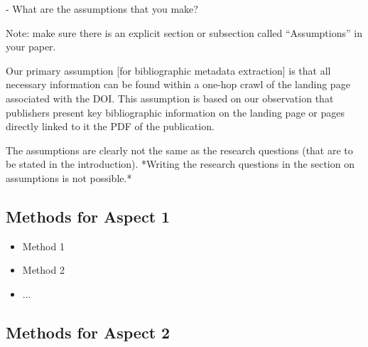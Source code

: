 \documentclass[sigconf, review, nonacm]{acmart}
\begin{document}
- What are the assumptions that you make?

Note: make sure there is an explicit section or subsection called ``Assumptions'' in your paper.

\begin{tcolorbox}
[title=Example: A textbook example of what an assumption is]
Our primary assumption [for bibliographic metadata extraction] is that all necessary information can be found within a one-hop crawl of the landing page associated with the DOI. This assumption is based on our observation that publishers present key bibliographic information on the landing page or pages directly linked to it \eg the PDF of the publication.
\end{tcolorbox}


\begin{tcolorbox}
[title=Assumptions: Difference to research questions.]
The assumptions are clearly not the same as the research questions (that are to be stated in the introduction). *Writing the research questions in the section on assumptions is not possible.* 
\end{tcolorbox}



\subsection{Methods for Aspect 1}


\begin{itemize}
    \item Method 1
    \item Method 2
    \item ...
\end{itemize}

\subsection{Methods for Aspect 2}
\end{document}
